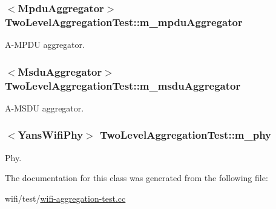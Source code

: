 \subsubsection[{\texorpdfstring{m\+\_\+mpdu\+Aggregator}{m_mpduAggregator}}]{$<${\bf Mpdu\+Aggregator}$>$ Two\+Level\+Aggregation\+Test\+::m\+\_\+mpdu\+Aggregator\hspace{0.3cm}{\ttfamily [private]}}\hypertarget{classTwoLevelAggregationTest_af775305c6bfb80987c93ad200627318a}{}\label{classTwoLevelAggregationTest_af775305c6bfb80987c93ad200627318a}


A-\/\+M\+P\+DU aggregator. 

\subsubsection[{\texorpdfstring{m\+\_\+msdu\+Aggregator}{m_msduAggregator}}]{$<${\bf Msdu\+Aggregator}$>$ Two\+Level\+Aggregation\+Test\+::m\+\_\+msdu\+Aggregator\hspace{0.3cm}{\ttfamily [private]}}\hypertarget{classTwoLevelAggregationTest_aa220c44047f05dcda7f98f4a3856aade}{}\label{classTwoLevelAggregationTest_aa220c44047f05dcda7f98f4a3856aade}


A-\/\+M\+S\+DU aggregator. 

\subsubsection[{\texorpdfstring{m\+\_\+phy}{m_phy}}]{$<${\bf Yans\+Wifi\+Phy}$>$ Two\+Level\+Aggregation\+Test\+::m\+\_\+phy\hspace{0.3cm}{\ttfamily [private]}}\hypertarget{classTwoLevelAggregationTest_a2e90603b55371a04829447a4341340b7}{}\label{classTwoLevelAggregationTest_a2e90603b55371a04829447a4341340b7}


Phy. 



The documentation for this class was generated from the following file\+:\begin{DoxyCompactItemize}
\item 
wifi/test/\hyperlink{wifi-aggregation-test_8cc}{wifi-\/aggregation-\/test.\+cc}\end{DoxyCompactItemize}
